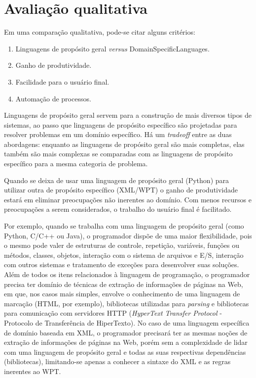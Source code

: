 \section{Avaliação qualitativa}

Em uma comparação qualitativa, pode-se citar alguns critérios:

\begin{enumerate}
	\item Linguagens de propósito geral \emph{versus} \glspl{DomainSpecificLanguage}.
	\item Ganho de produtividade.
	\item Facilidade para o usuário final.
	\item Automação de processos.
\end{enumerate}

Linguagens de propósito geral servem para a construção de mais diversos tipos de sistemas, ao passo que linguagens de propósito específico são projetadas para resolver problemas em um domínio específico. Há um \emph{tradeoff} entre as duas abordagens: enquanto as linguagens de propósito geral são mais completas, elas também são mais complexas se comparadas com as linguagens de propósito específico para a mesma categoria de problema.

Quando se deixa de usar uma linguagem de propósito geral (Python) para utilizar outra de propósito específico (XML/WPT) o ganho de produtividade estará em eliminar preocupações não inerentes ao domínio. Com menos recursos e preocupações a serem considerados, o trabalho do usuário final é facilitado.

Por exemplo, quando se trabalha com uma linguagem de propósito geral (como Python, C/C++ ou Java), o programador dispõe de uma maior flexibilidade, pois o mesmo pode valer de estruturas de controle, repetição, variáveis, funções ou métodos, classes, objetos, interação com o sistema de arquivos e E/S, interação com outros sistemas e tratamento de exceções para desenvolver suas soluções. Além de todos os itens relacionados à linguagem de programação, o programador precisa ter domínio de técnicas de extração de informações de páginas na Web, em que, nos casos mais simples, envolve o conhecimento de uma linguagem de marcação (HTML, por exemplo), bibliotecas utilizadas para \emph{parsing} e bibliotecas para comunicação com servidores HTTP (\emph{HyperText Transfer Protocol} - Protocolo de Transferência de HiperTexto). No caso de uma linguagem específica de domínio baseada em XML, o programador precisará ter as mesmas noções de extração de informações de páginas na Web, porém sem a complexidade de lidar com uma linguagem de propósito geral e todas as suas respectivas dependências (bibliotecas), limitando-se apenas a conhecer a sintaxe do XML e as regras inerentes ao WPT.

